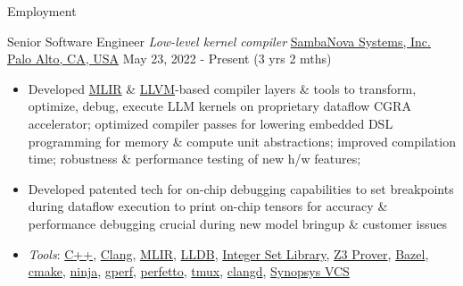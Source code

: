 \documentclass[]{mcdowellcv}
\begin{document}
\makeheader

\begin{cvsection}{Employment}
  \begin{cvsubsection}
    {Senior Software Engineer \linebreak \textit{Low-level kernel compiler}}
    {\href{https://sambanova.ai/}{SambaNova Systems, Inc. \linebreak Palo Alto, CA, USA}}
    {May 23, 2022 - Present (3 yrs 2 mths)}
    \begin{itemize}
      \item
            Developed \href{https://mlir.llvm.org/}{MLIR} \&
            \href{https://llvm.org/}{LLVM}-based compiler layers \& tools to
            transform, optimize, debug, execute LLM kernels on proprietary
            dataflow CGRA accelerator; optimized compiler passes for lowering
            embedded DSL programming for memory \& compute unit abstractions;
            improved compilation time; robustness \& performance testing of new
            h/w features;
      \item
            Developed patented tech for on-chip debugging capabilities to
            set breakpoints during dataflow execution to print on-chip tensors
            for accuracy \& performance debugging crucial during new model
            bringup \& customer issues
      \item
            \textit{Tools}:
            \href{https://isocpp.org/}{C++},
            \href{https://clang.llvm.org/}{Clang},
            \href{https://mlir.llvm.org/}{MLIR},
            \href{https://lldb.llvm.org/}{LLDB},
            \href{https://libisl.sourceforge.io/}{Integer Set Library},
            \href{https://github.com/Z3Prover/z3}{Z3 Prover},
            \href{https://bazel.build/}{Bazel},
            \href{https://cmake.org/}{cmake},
            \href{https://ninja-build.org/}{ninja},
            \href{https://gperftools.github.io/gperftools/cpuprofile.html}{gperf},
            \href{https://perfetto.dev/}{perfetto},
            \href{https://github.com/tmux/tmux}{tmux},
            \href{https://clangd.llvm.org/}{clangd},
            \href{https://www.synopsys.com/verification/simulation/vcs.html}{Synopsys VCS}
    \end{itemize}
  \end{cvsubsection}


\end{cvsection}
\end{document}
